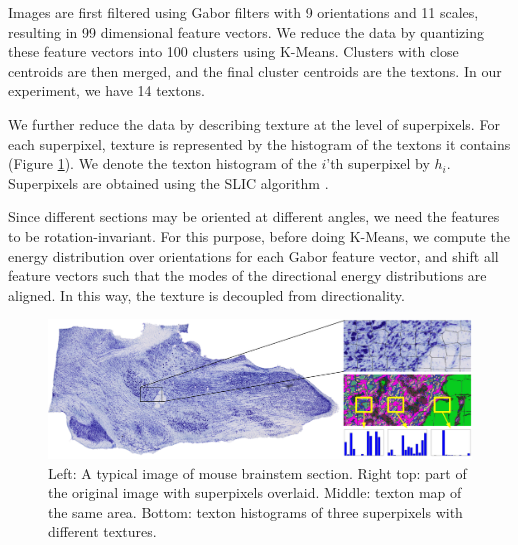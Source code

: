 \documentclass{llncs}
\begin{document}
Images are first filtered using Gabor filters\cite{jain1990unsupervised, clausi2000designing} with 9 orientations and 11 scales, resulting in 99 dimensional feature vectors. We reduce the data by quantizing these feature vectors into 100 clusters using K-Means. Clusters with close centroids are then merged, and the final cluster centroids are the textons. In our experiment, we have 14 textons.


We further reduce the data by describing texture at the level of superpixels. For each superpixel, texture is represented by the histogram of the textons it contains (Figure \ref{fig:TextonHistComparison}). We denote the texton histogram of the $i$'th superpixel by $h_i$. Superpixels are obtained using the SLIC algorithm \cite{achanta2012slic}.

Since different sections may be oriented at different angles, 
we need the features to be rotation-invariant. For this purpose, before doing K-Means, we compute the energy distribution over orientations for each Gabor feature vector, and shift all feature vectors such that the modes of the directional energy distributions are aligned. In this way, the texture is decoupled from directionality.


\begin{figure}
	\includegraphics[width=\textwidth]{../figures/OrigImgTexMapWithInset.png}
	\caption{Left: A typical image of mouse brainstem section. Right top: part of the original image with superpixels overlaid. Middle: texton map of the same area. Bottom: texton histograms of three superpixels with different textures.}
	\label{fig:TextonHistComparison}
\end{figure}

\end{document}
